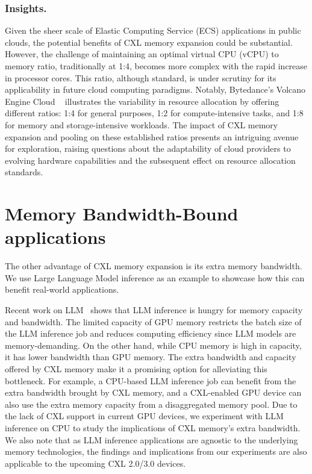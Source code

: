 \subsubsection{Insights.}
Given the sheer scale of Elastic Computing Service (ECS) applications in public clouds, the potential benefits of CXL memory expansion could be substantial. However, the challenge of maintaining an optimal virtual CPU (vCPU) to memory ratio, traditionally at 1:4, becomes more complex with the rapid increase in processor cores. This ratio, although standard, is under scrutiny for its applicability in future cloud computing paradigms. Notably, Bytedance's Volcano Engine Cloud ~\cite{volcano} illustrates the variability in resource allocation by offering different ratios: 1:4 for general purposes, 1:2 for compute-intensive tasks, and 1:8 for memory and storage-intensive workloads. The impact of CXL memory expansion and pooling on these established ratios presents an intriguing avenue for exploration, raising questions about the adaptability of cloud providers to evolving hardware capabilities and the subsequent effect on resource allocation standards.




\section{Memory Bandwidth-Bound applications}

\label{sec:bandwidth}

The other advantage of CXL memory expansion is its extra memory bandwidth. We use Large Language Model inference as an example to showcase how this can benefit real-world applications.

Recent work on LLM~\cite{gpt4} shows that LLM inference is hungry for memory capacity and bandwidth.
The limited capacity of GPU memory restricts the batch size of the LLM inference job and reduces computing efficiency since LLM models are memory-demanding.
On the other hand, while CPU memory is high in capacity, it has lower bandwidth than GPU memory.
The extra bandwidth and capacity offered by CXL memory make it a promising option for alleviating this bottleneck.
For example, a CPU-based LLM inference job can benefit from the extra bandwidth brought by CXL memory, and a CXL-enabled GPU device can also use the extra memory capacity from a disaggregated memory pool.
Due to the lack of CXL support in current GPU devices, we experiment with LLM inference on CPU to study the implications of CXL memory's extra bandwidth.
We also note that as LLM inference applications are agnostic to the underlying memory technologies, the findings and implications from our experiments are also applicable to the upcoming CXL 2.0/3.0 devices.


